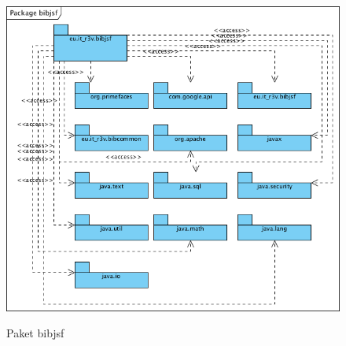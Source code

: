 \documentclass[fontsize=12pt,paper=a4,twoside]{scrartcl}
\begin{document}
\begin{figure} [H] 
\caption{Paket bibjsf} \centering
	\includegraphics[width=1\textwidth]{Diagramme/Packagebibjsf.png} 
	\label{pic:PackagebibjsfUebersicht} 
\end{figure}
\end{document}
